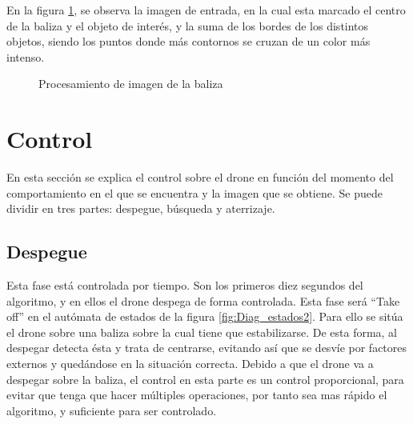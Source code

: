 \hspace{1 cm} En la figura \ref{f:ColorFilterTotal}, se observa la imagen de entrada, en la cual esta marcado el centro de la baliza y el objeto de inter\'es, y la suma de los bordes de los distintos objetos, siendo los puntos donde m\'as contornos se cruzan de un color m\'as intenso. 

\begin{figure}[H]
 \centering
 \caption{Procesamiento de imagen de la baliza}
 \label{f:ColorFilterTotal}
\end{figure} 



\section{Control}
\label{sec.control}

\hspace{1 cm} En esta secci\'on se explica el control sobre el drone en funci\'on del momento del comportamiento en el que se encuentra y la imagen que se obtiene. Se puede dividir en tres partes:
despegue, b\'usqueda y aterrizaje.


\subsection{Despegue}

\hspace{1 cm} Esta fase est\'a controlada por tiempo. Son los primeros diez segundos del algoritmo, y en ellos el drone despega de forma controlada. Esta fase ser\'a "`Take off"' en el aut\'omata de estados de la figura \ref{fig:Diag_estados2}. Para ello se sit\'ua el drone sobre una baliza sobre la cual tiene que estabilizarse. De esta forma, al despegar detecta \'esta y trata de centrarse, evitando as\'i que se desv\'ie por factores externos y qued\'andose en la situaci\'on correcta. Debido a que el drone va a despegar sobre la baliza, el control en esta parte es un control proporcional, para evitar que tenga que hacer m\'ultiples operaciones, por tanto sea mas r\'apido el algoritmo, y suficiente para ser controlado.


